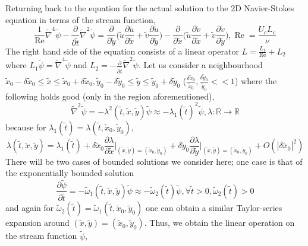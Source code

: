 \documentclass{article}
\begin{document}
Returning back to the equation for the actual solution to the 2D Navier-Stokes equation in terms of the stream function,
\begin{equation*}
\frac{1}{\operatorname{Re}}\tilde{\nabla}^4 \tilde{\psi} - \frac{\partial}{\partial \tilde{t}} \tilde{\nabla}^2 \tilde{\psi} = \frac{\partial}{\partial \tilde{y}}\bigg(\tilde{u}\frac{\partial \tilde{u}}{\partial \tilde{x}}+\tilde{v}\frac{\partial \tilde{u}}{\partial \tilde{y}}\bigg)-\frac{\partial}{\partial \tilde{x}}\bigg(\tilde{u}\frac{\partial \tilde{v}}{\partial \tilde{x}}+\tilde{v}\frac{\partial \tilde{v}}{\partial \tilde{y}}\bigg), \operatorname{Re} = \frac{U_c L_c}{\nu}
\end{equation*}
The right hand side of the equation consists of a linear operator $L = \frac{L_1}{\operatorname{Re}}+L_2$ where $L_1 \tilde{\psi} = \tilde{\nabla}^4 \tilde{\psi}$ and $L_2 = -\frac{\partial}{\partial \tilde{t}}\tilde{\nabla}^2 \tilde{\psi}$. Let us consider a neighbourhood $\tilde{x}_0 - \delta \tilde{x}_0 \le \tilde{x} \le \tilde{x}_0 + \delta \tilde{x}_0, \tilde{y}_0 - \delta \tilde{y}_0 \le \tilde{y} \le \tilde{y}_0 + \delta \tilde{y}_0$ ($\frac{\delta \tilde{x}_0}{\tilde{x}_0}, \frac{\delta \tilde{y}_0}{\tilde{y}_0} << 1$) where the following holds good (only in the region aforementioned),
\begin{equation*}
\tilde{\nabla}^2 \tilde{\psi} = -\lambda^2(\tilde{t}, \tilde{x}, \tilde{y}) \tilde{\psi} \approx -\lambda_1(\tilde{t})^2\tilde{\psi}, \lambda : \mathbb{R} \to \mathbb{R}
\end{equation*}
because for $\lambda_1(\tilde{t}) = \lambda(\tilde{t}, \tilde{x}_0, \tilde{y}_0)$,
\begin{equation*}
\lambda(\tilde{t}, \tilde{x}, \tilde{y}) = \lambda_1(\tilde{t}) + \delta \tilde{x}_0 \frac{\partial \lambda}{\partial \tilde{x}}\bigg|_{(\tilde{x}, \tilde{y}) = (\tilde{x}_0, \tilde{y}_0)} + \delta \tilde{y}_0 \frac{\partial \lambda}{\partial \tilde{y}}\bigg|_{(\tilde{x}, \tilde{y}) = (\tilde{x}_0, \tilde{y}_0)} + O(|\delta \tilde{x}_0|^2)
\end{equation*}
There will be two cases of bounded solutions we consider here; one case is that of the exponentially bounded solution
\begin{equation*}
\frac{\partial \tilde{\psi}}{\partial \tilde{t}} = -\tilde{\omega}_1(\tilde{t}, \tilde{x}, \tilde{y}) \tilde{\psi} \approx -\tilde{\omega}_2(\tilde{t})\tilde{\psi}, \forall \tilde{t} > 0, \tilde{\omega}_2(\tilde{t}) > 0
\end{equation*}
and again for $\tilde{\omega}_2(\tilde{t}) = \tilde{\omega}_1(\tilde{t}, \tilde{x}_0, \tilde{y}_0)$ one can obtain a similar Taylor-series expansion around $(\tilde{x}, \tilde{y}) = (\tilde{x}_0, \tilde{y}_0)$. Thus, we obtain the linear operation on the stream function $\tilde{\psi}$,
\end{document}
